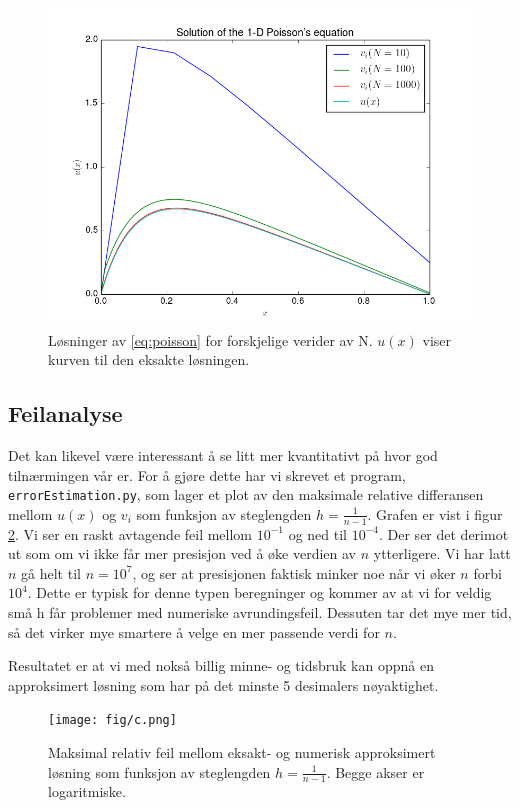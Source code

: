 \documentclass[11pt]{article}
\begin{document}
\begin{figure}[ht]
  \centering
  \includegraphics[scale=0.7]{fig/b.png}
  \caption{\label{fig:b} Løsninger av \eqref{eq:poisson} for
    forskjelige verider av N. $u(x)$ viser kurven til den eksakte løsningen.}
\end{figure}

\subsection{Feilanalyse}
Det kan likevel være interessant å se litt mer kvantitativt på hvor
god tilnærmingen vår er. For å gjøre dette har vi skrevet et program,
\texttt{errorEstimation.py}, som lager et plot av den maksimale
relative differansen mellom $u(x)$ og $v_i$ som funksjon av
steglengden $h = \frac{ 1 }{ n-1 }$. Grafen er vist i figur
\ref{fig:c}. Vi ser en raskt avtagende feil mellom $10^{-1}$ og ned
til $10^{-4}$. Der ser det derimot ut som om vi ikke får mer presisjon
ved å øke verdien av $n$ ytterligere. Vi har latt $n$ gå helt til
$n=10^7$, og ser at presisjonen faktisk minker noe når vi øker $n$
forbi $10^4$. Dette er typisk for denne typen beregninger og kommer av at vi for veldig små h får problemer
med numeriske avrundingsfeil. Dessuten tar det mye mer tid,
så det virker mye smartere å velge en mer passende verdi for $n$. 

Resultatet er at vi med nokså billig minne- og tidsbruk kan oppnå en
approksimert løsning som har på det minste 5 desimalers
nøyaktighet. 

\begin{figure}[ht]
  \centering
  \texttt{[image: fig/c.png]}
  \caption{\label{fig:c} Maksimal relativ feil mellom eksakt-
    og numerisk approksimert løsning som funksjon av steglengden $h =
    \frac{ 1 }{ n-1 }$. Begge akser er logaritmiske.}
\end{figure}
\end{document}
